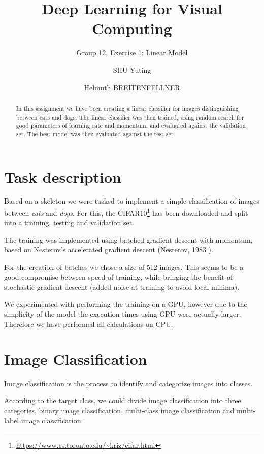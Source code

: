 \documentclass[sigconf,nonacm]{acmart}
\begin{document}
\title{Deep Learning for Visual Computing}
\subtitle{Group 12, Exercise 1: Linear Model}
\author{SHU Yuting}
\author{Helmuth BREITENFELLNER}
\begin{abstract}
In this assignment we have been creating a linear classifier for images
distinguishing between cats and dogs.
The linear classifier was then trained, using random search for good
parameters of learning rate and momentum, and evaluated against the
validation set.
The best model was then evaluated against the test set.
\end{abstract}
\maketitle
\section{Task description}
Based on a skeleton we were tasked to implement a simple classification
of images between \emph{cats} and \emph{dogs}.
For this, the CIFAR10\footnote{\url{https://www.cs.toronto.edu/~kriz/cifar.html}}
has been downloaded and split into a training, testing and validation
set.

The training was implemented using batched gradient descent with
momentum, based on Nesterov's accelerated gradient descent
(Nesterov, 1983 \cite{Nes83}).

For the creation of batches we chose a size of 512 images.
This seems to be a good compromise between speed of training,
while bringing the benefit of stochastic gradient descent
(added noise at training to avoid local minima).

We experimented with performing the training on a GPU,
however due to the simplicity of the model the execution times using
GPU were actually larger.
Therefore we have performed all calculations on CPU.

\section{Image Classification}

Image classification is the process to identify and categorize images
into classes.

According to the target class, we could divide image classification into three categories, binary image classification, multi-class image classification and multi-label image classification.
\end{document}
